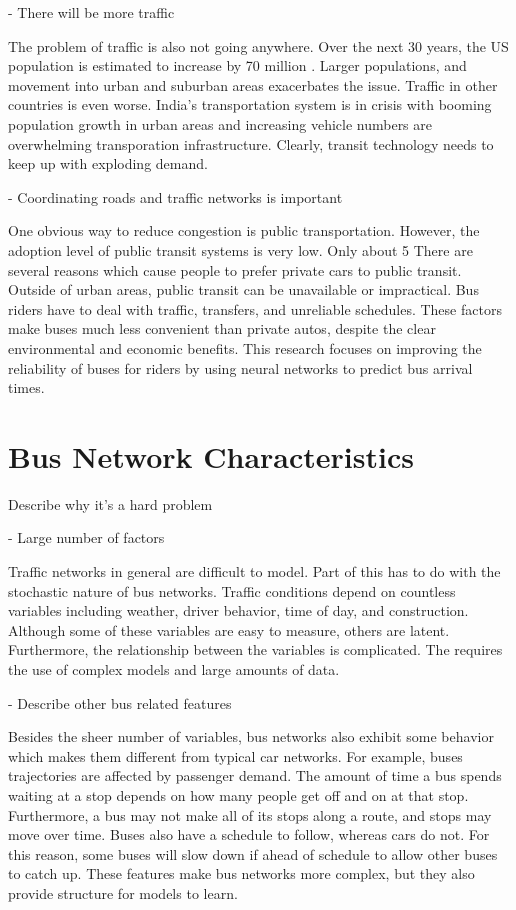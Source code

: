 - There will be more traffic

The problem of traffic is also not going anywhere.
Over the next 30 years, the US population is estimated to increase by 70 million \cite{traffic}.
Larger populations, and movement into urban and suburban areas exacerbates the issue.
Traffic in other countries is even worse.
India's transportation system is in crisis with booming population growth in urban areas and increasing vehicle numbers are overwhelming transporation infrastructure.
Clearly, transit technology needs to keep up with exploding demand.

- Coordinating roads and traffic networks is important

One obvious way to reduce congestion is public transportation.
However, the adoption level of public transit systems is very low.
Only about 5%
There are several reasons which cause people to prefer private cars to public transit.
Outside of urban areas, public transit can be unavailable or impractical.
Bus riders have to deal with traffic, transfers, and unreliable schedules.
These factors make buses much less convenient than private autos, despite the clear environmental and economic benefits.
This research focuses on improving the reliability of buses for riders by using neural networks to predict bus arrival times.


\section{Bus Network Characteristics}
Describe why it's a hard problem

- Large number of factors

Traffic networks in general are difficult to model.
Part of this has to do with the stochastic nature of bus networks.
Traffic conditions depend on countless variables including weather, driver behavior, time of day, and construction.
Although some of these variables are easy to measure, others are latent.
Furthermore, the relationship between the variables is complicated.
The requires the use of complex models and large amounts of data.

- Describe other bus related features

Besides the sheer number of variables, bus networks also exhibit some behavior which makes them different from typical car networks.
For example, buses trajectories are affected by passenger demand.
The amount of time a bus spends waiting at a stop depends on how many people get off and on at that stop.
Furthermore, a bus may not make all of its stops along a route, and stops may move over time.
Buses also have a schedule to follow, whereas cars do not.
For this reason, some buses will slow down if ahead of schedule to allow other buses to catch up.
These features make bus networks more complex, but they also provide structure for models to learn.

